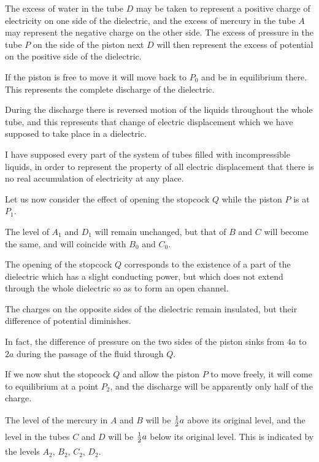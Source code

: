 \documentclass[12pt,oneside]{book}[2021/10/04]
\newcommand{\tstrut}{\rule[-1.5ex]{0pt}{4.2ex}}
\newcommand{\¬}{\hphantom{0}}
\begin{document}
The excess of water in the tube \(D\) may be taken to represent a
positive charge of electricity on one side of the dielectric, and the
excess of mercury in the tube \(A\) may represent the negative charge
on the other side. The excess of pressure in the tube \(P\) on the
side of the piston next \(D\) will then represent the excess of potential
on the positive side of the dielectric.

If the piston is free to move it will move back to \(P_0\) and be in
equilibrium there. This represents the complete discharge of the
dielectric.

During the discharge there is reversed motion of the liquids
throughout the whole tube, and this represents that change of
electric displacement which we have supposed to take place in a
dielectric.

I have supposed every part of the system of tubes filled with
incompressible liquids, in order to represent the property of all
electric displacement that there is no real accumulation of electricity
at any place.

Let us now consider the effect of opening the stopcock \(Q\) while
the piston \(P\) is at \(P_1\).

The level of \(A_1\) and \(D_1\) will remain unchanged, but that of \(B\) and
\(C\) will become the same, and will coincide with \(B_0\) and \(C_0\).

The opening of the stopcock \(Q\) corresponds to the existence of
a part of the dielectric which has a slight conducting power, but
which does not extend through the whole dielectric so as to form
an open channel.

The charges on the opposite sides of the dielectric remain insulated,
but their difference of potential diminishes.

In fact, the difference of pressure on the two sides of the piston
sinks from \(4a\) to \(2a\) during the passage of the fluid through \(Q\).

If we now shut the stopcock \(Q\) and allow the piston \(P\) to move
freely, it will come to equilibrium at a point \(P_2\), and the discharge
will be apparently only half of the charge.

The level of the mercury in \(A\) and \(B\) will be \(\tstrut\frac{1}{2}a\) above its
original level, and the level in the tubes \(C\) and \(D\) will be \(\tstrut\frac{1}{2}a\)
below its original level. This is indicated by the levels \(A_2\), \(B_2\),
\(C_2\), \(D_2\).
\end{document}
